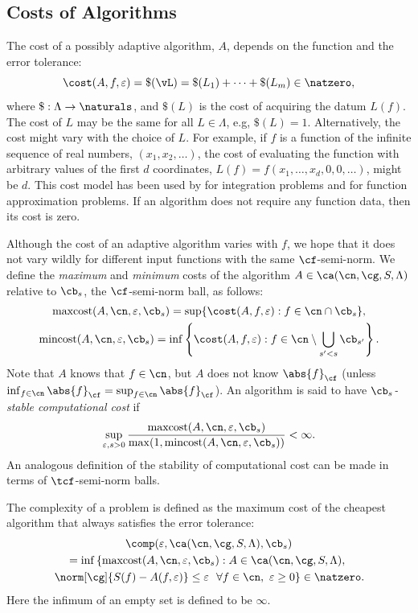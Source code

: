 \documentclass[]{elsarticle}
\DeclareMathOperator{\maxcost}{maxcost}
\DeclareMathOperator{\mincost}{mincost}
\theoremstyle{definition}
\theoremstyle{remark}
\newcommand{\Fnorm}[1]{\abs{#1}_{\cf}}
\begin{document}
\subsection{Costs of Algorithms} \label{AlgoCostsec}

The cost of a possibly adaptive algorithm, $A$, depends on the function and the error tolerance: 
\[
\cost(A,f,\varepsilon) = \$(\vL) = \$(L_1) + \cdots +\$(L_m) \in \natzero,
\]
where $\$:\Lambda \to \naturals$, and $\$(L)$ is the cost of acquiring the datum $L(f)$. The cost of $L$ may be the same for all $L \in \Lambda$, e.g, $\$(L)=1$.  Alternatively, the cost might vary with the choice of $L$.  For example, if $f$ is a function of the infinite sequence of real numbers, $(x_1, x_2, \ldots)$, the cost of evaluating the function with arbitrary values of the first $d$ coordinates, $L(f)=f(x_1, \ldots, x_d, 0, 0, \ldots)$, might be $d$.  This cost model has been used by \cite{HicMGRitNiu09a,KuoEtal10a,NiuHic09a,NiuHic09b,PlaWas11a} for integration problems and \cite{Was13a,WasWoz11a,WasWoz11b} for function approximation problems.  If an algorithm does not require any function data, then its cost is zero.

Although the cost of an adaptive algorithm varies with $f$, we hope that it does not vary wildly for different input functions with the same $\cf$-semi-norm. We define the \emph{maximum} and \emph{minimum} costs of the algorithm $A\in \ca(\cn,\cg,S,\Lambda)$ relative to $\cb_{s}$, the $\cf$-semi-norm ball, as follows:
\begin{gather*}
\maxcost(A,\cn,\varepsilon,\cb_s)
= \sup \{ \cost(A,f,\varepsilon) : f \in \cn \cap \cb_{s} \}, \\ \mincost(A,\cn,\varepsilon,\cb_s)
= \inf \left \{ \cost(A,f,\varepsilon) : f \in \cn\setminus \bigcup_{s'<s}\cb_{s'} \right\} .
\end{gather*}
Note that $A$ knows that $f \in \cn$, but $A$ does not know $\Fnorm{f}$ (unless $\inf_{f \in \cn} \Fnorm{f}=\sup_{f \in \cn} \Fnorm{f}$).  An algorithm is said to have \emph{$\cb_{s}$-stable computational cost} if 
\begin{equation*}\label{coststabledef}
\sup_{\varepsilon, s > 0} \frac{\maxcost(A,\cn,\varepsilon,\cb_s)}{\max(1,\mincost(A,\cn,\varepsilon, \cb_s))} < \infty.
\end{equation*} 
An analogous definition of the stability of computational cost can be made in terms of $\tcf$-semi-norm balls.

The complexity of a problem is defined as the maximum cost of the cheapest algorithm that always satisfies the error tolerance:
\begin{multline*} \label{complexdef}
\comp(\varepsilon,\ca(\cn,\cg,S,\Lambda),\cb_s) \\
 = \inf\left\{\maxcost(A,\cn,\varepsilon,\cb_s) : A \in \ca(\cn,\cg,S,\Lambda), \right. \\
 \left . \norm[\cg]{S(f)-A(f,\varepsilon)} \le \varepsilon \ \ \forall f \in \cn, \ \varepsilon \ge 0 \right \} \in \natzero.
\end{multline*}
Here the infimum of an empty set is defined to be $\infty$.  
\end{document}

